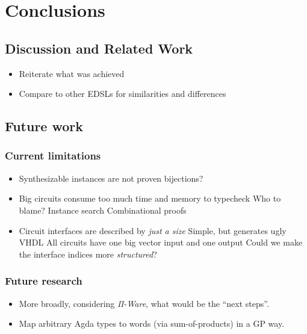 \chapter{Conclusions}
\label{chap:conclusions}

    \section{Discussion and Related Work}
    \label{sec:related-work}
        \begin{itemize}
            \item Reiterate what was achieved
            \item Compare to other \acp{EDSL} for similarities and differences
        \end{itemize}


    \section{Future work}
    \label{sec:future-work}

        \subsection{Current limitations}
        \label{subsec:current-limitations}
            \begin{itemize}
                \item Synthesizable instances are not proven bijections?
                \item Big circuits consume too much time and memory to typecheck
                    \subitem Who to blame?
                    \subitem Instance search
                    \subitem Combinational proofs
                \item Circuit interfaces are described by \emph{just a size}
                    \subitem Simple, but generates ugly VHDL
                    \subitem All circuits have one big vector input and one output
                    \subitem Could we make the interface indices more \emph{structured}?
            \end{itemize}

        \subsection{Future research}
        \label{subsec:future-research}
            \begin{itemize}
                \item More broadly, considering \emph{Π-Ware}, what would be the ``next steps''.
                \item Map arbitrary Agda types to words (via sum-of-products) in a GP way.
            \end{itemize}

